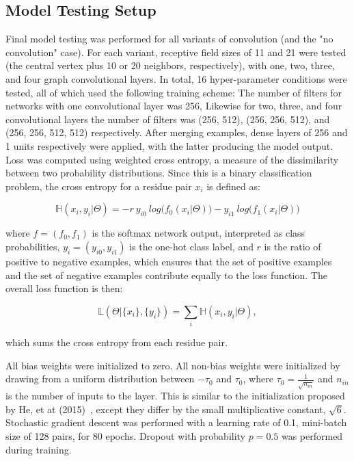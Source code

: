 \subsection{Model Testing Setup}

Final model testing was performed for all variants of convolution (and the "no convolution" case).
For each variant, receptive field sizes of 11 and 21 were tested (the central vertex plus 10 or 20 neighbors, respectively), with one, two, three, and four graph convolutional layers. 
In total, 16 hyper-parameter conditions were tested, all of which used the following training scheme:
The number of filters for networks with one convolutional layer was 256, Likewise for two, three, and four convolutional layers the number of filters was (256, 512), (256, 256, 512), and (256, 256, 512, 512) respectively.
After merging examples, dense layers of 256 and 1 units respectively were applied, with the latter producing the model output.
Loss was computed using weighted cross entropy, a measure of the dissimilarity between two probability distributions.
Since this is a binary classification problem, the cross entropy for a residue pair $x_i$ is defined as: 

\begin{equation}
\mathbb{H}(x_i, y_i | \Theta) = - r ~ y_{i0} ~ log\big(f_0(x_i|\Theta)\big) - y_{i1} ~ log\big(f_1(x_i|\Theta)\big)
\label{eq:weighted_ce}
\end{equation}

\noindent
where $f = (f_0, f_1)$ is the softmax network output, interpreted as class probabilities, $y_i = (y_{i0}, y_{i1})$ is the one-hot class label, and $r$ is the ratio of positive to negative examples, which ensures that the set of positive examples and the set of negative examples contribute equally to the loss function.
The overall loss function is then:

\begin{equation}
\mathbb{L}(\Theta | \{x_i\}, \{y_i\}) = \sum_{i} \mathbb{H}(x_i, y_i | \Theta),
\end{equation}

\noindent
which sums the cross entropy from each residue pair.


All bias weights were initialized to zero.
All non-bias weights were initialized by drawing from a uniform distribution between $-\tau_0$ and $\tau_0$, where $\tau_0=\frac{1}{\sqrt{n_{in}}}$ and $n_{in}$ is the number of inputs to the layer.
This is similar to the initialization proposed by He, et at (2015)~\cite{he2015}, except they differ by the small multiplicative constant, $\sqrt{6}$.
Stochastic gradient descent was performed with a learning rate of 0.1, mini-batch size of 128 pairs, for 80 epochs.
Dropout with probability $p=0.5$ was performed during training.

